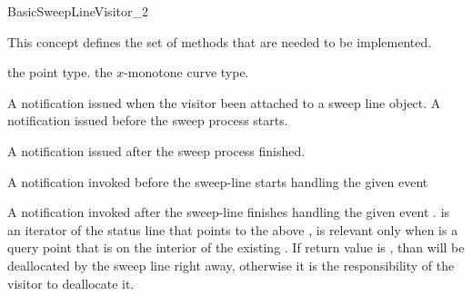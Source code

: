 \ccRefPageBegin

\begin{ccRefConcept}{BasicSweepLineVisitor_2}

\ccDefinition

This concept defines the set of methods that are needed to be implemented.



\ccTypes


    {the point type.}
\ccGlue
{}
    {the $x$-monotone curve type.}

\ccGlue
{}
\ccGlue
{}
\ccGlue



    {A notification issued when the visitor been attached to a sweep line object.}
\ccGlue
{}
    {A notification issued before the sweep process starts.}
\ccGlue

    {A notification issued after the sweep process finished.}
\ccGlue

    {A notification invoked before the sweep-line starts handling the given
     event  }
\ccGlue

    {A notification invoked after the sweep-line finishes handling the given
     event . is an iterator of the status line that points to the  above 
     ,  is relevant only when  is a query point that is on the interior of the existing .
     If return value is , than  will be deallocated by the sweep line right away, otherwise it is the responsibility
     of the visitor to deallocate it.}
\ccGlue


\end{ccRefConcept}
